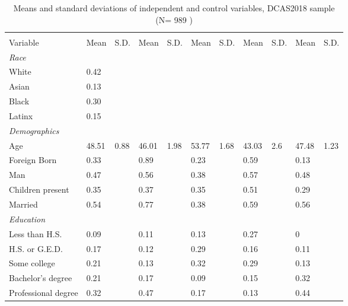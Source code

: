 % 
\begin{sidewaystable}[ht]
\centering
\caption{Means and standard deviations of independent and control variables, DCAS2018 sample  (N= 989 )} 
\label{tab:descriptives18}
\begin{tabular}{lR{.4in}R{.4in}R{.4in}R{.4in}R{.4in}R{.4in}R{.4in}R{.4in}R{.4in}R{.4in}}
  \toprule
&  &  &  &  &  \\
Variable & Mean & S.D. & Mean & S.D. & Mean & S.D. & Mean & S.D. & Mean & S.D. \\ 
  \midrule
\emph{Race}&&\\White &  0.42 &  &  &  &  &  &  &  &  &  \\ 
  Asian &  0.13 &  &  &  &  &  &  &  &  &  \\ 
  Black &  0.30 &  &  &  &  &  &  &  &  &  \\ 
  Latinx\vspace{1em} &  0.15 &  &  &  &  &  &  &  &  &  \\ 
  \emph{Demographics}&&\\Age & 48.51 & 0.88 & 46.01 & 1.98 & 53.77 & 1.68 & 43.03 & 2.6 & 47.48 & 1.23 \\ 
  Foreign Born &  0.33 &  & 0.89 &  & 0.23 &  & 0.59 &  & 0.13 &  \\ 
  Man &  0.47 &  & 0.56 &  & 0.38 &  & 0.57 &  & 0.48 &  \\ 
  Children present &  0.35 &  & 0.37 &  & 0.35 &  & 0.51 &  & 0.29 &  \\ 
  Married\vspace{1em} &  0.54 &  & 0.77 &  & 0.38 &  & 0.59 &  & 0.56 &  \\ 
  \emph{Education}&&\\Less than H.S. &  0.09 &  & 0.11 &  & 0.13 &  & 0.27 &  & 0 &  \\ 
  H.S. or G.E.D. &  0.17 &  & 0.12 &  & 0.29 &  & 0.16 &  & 0.11 &  \\ 
  Some college &  0.21 &  & 0.13 &  & 0.32 &  & 0.29 &  & 0.13 &  \\ 
  Bachelor's degree &  0.21 &  & 0.17 &  & 0.09 &  & 0.15 &  & 0.32 &  \\ 
  Professional degree\vspace{1em} &  0.32 &  & 0.47 &  & 0.17 &  & 0.13 &  & 0.44 &  \\ 

\end{tabular}
\end{sidewaystable}

